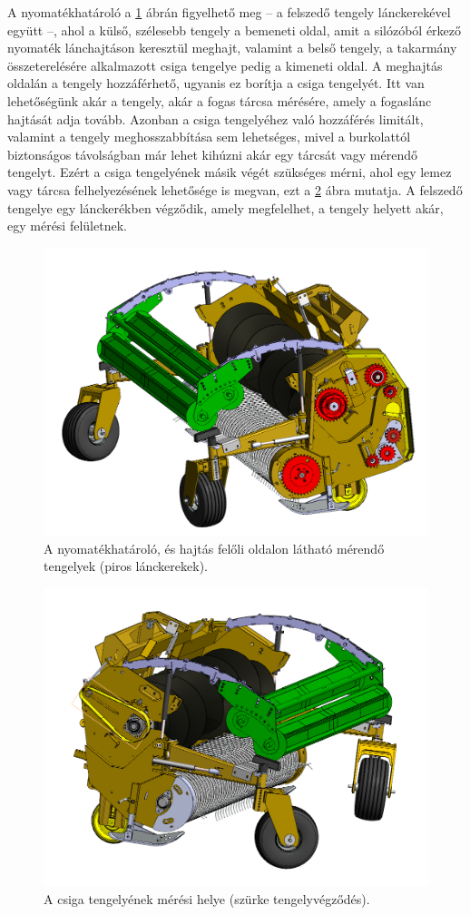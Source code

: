 A nyomatékhatároló a \ref{nyomatekhatarolo} ábrán figyelhető meg -- a felszedő tengely lánckerekével együtt --, ahol a külső, szélesebb tengely a bemeneti oldal, amit a silózóból érkező nyomaték lánchajtáson keresztül meghajt, valamint a belső tengely, a takarmány összeterelésére alkalmazott csiga tengelye pedig a kimeneti oldal. A meghajtás oldalán a tengely hozzáférhető, ugyanis ez borítja a csiga tengelyét. Itt van lehetőségünk akár a tengely, akár a fogas tárcsa mérésére, amely a fogaslánc hajtását adja tovább. Azonban a csiga tengelyéhez való hozzáférés limitált, valamint a tengely meghosszabbítása sem lehetséges, mivel a burkolattól biztonságos távolságban már lehet kihúzni akár egy tárcsát vagy mérendő tengelyt. Ezért a csiga tengelyének másik végét szükséges mérni, ahol egy lemez vagy tárcsa felhelyezésének lehetősége is megvan, ezt a \ref{tuloldali_csiga} ábra mutatja. A felszedő tengelye egy lánckerékben végződik, amely megfelelhet, a tengely helyett akár, egy mérési felületnek.
\begin{figure}
	\centering
	\includegraphics[width=.7\columnwidth]{figures/hajtas_oldal.png}
	\caption{A nyomatékhatároló, és hajtás felőli oldalon látható mérendő tengelyek (piros lánckerekek).}
	\label{nyomatekhatarolo}
\end{figure}
\begin{figure}
	\centering
	\includegraphics[width=.7\columnwidth]{figures/csiga_oldal.png}
	\caption{A csiga tengelyének mérési helye (szürke tengelyvégződés).}
	\label{tuloldali_csiga}
\end{figure}

